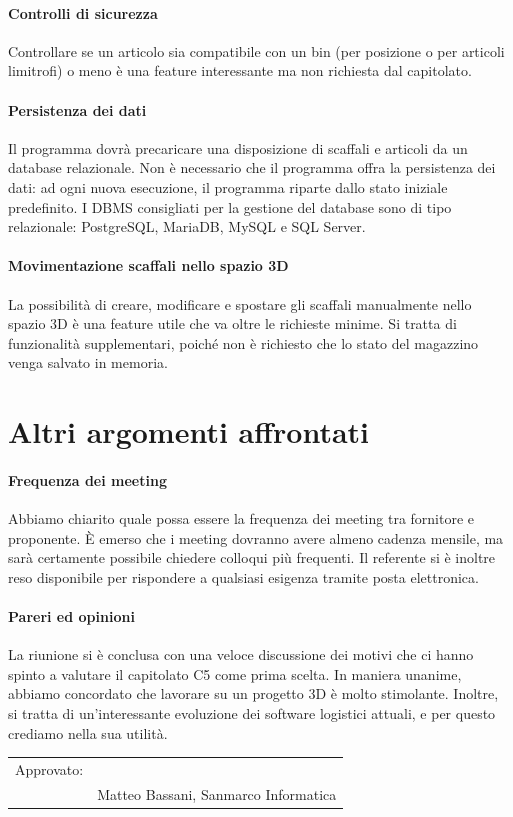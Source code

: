 \documentclass[12pt,a4paper]{article}
\begin{document}
\paragraph{Controlli di sicurezza}
Controllare se un articolo sia compatibile con un bin (per posizione o per articoli limitrofi) o meno è una feature interessante ma non richiesta dal capitolato.

\paragraph{Persistenza dei dati}
Il programma dovrà precaricare una disposizione di scaffali e articoli da un database relazionale. Non è necessario che il programma offra la persistenza dei dati: ad ogni nuova esecuzione, il programma riparte dallo stato iniziale predefinito. I DBMS consigliati per la gestione del database sono di tipo relazionale: PostgreSQL, MariaDB, MySQL e SQL Server.

\paragraph{Movimentazione scaffali nello spazio 3D} La possibilità di creare, modificare e spostare gli scaffali manualmente nello spazio 3D è una feature utile che va oltre le richieste minime. Si tratta di funzionalità supplementari, poiché non è richiesto che lo stato del magazzino venga salvato in memoria.

\section{Altri argomenti affrontati}

\paragraph{Frequenza dei meeting}
Abbiamo chiarito quale possa essere la frequenza dei meeting tra fornitore e proponente. È emerso che i meeting dovranno avere almeno cadenza mensile, ma sarà certamente possibile chiedere colloqui più frequenti. Il referente si è inoltre reso disponibile per rispondere a qualsiasi esigenza tramite posta elettronica.

\paragraph{Pareri ed opinioni}
La riunione si è conclusa con una veloce discussione dei motivi che ci hanno spinto a valutare il capitolato C5 come prima scelta. In maniera unanime, abbiamo concordato che lavorare su un progetto 3D è molto stimolante. Inoltre, si tratta di un'interessante evoluzione dei software logistici attuali, e per questo crediamo nella sua utilità.

\newpage

\begin{tabular}{@{}p{.5in}p{4in}@{}}
\small{Approvato:} & \hspace{0.3cm} \hrulefill \\
&  \hspace{0.3cm} \small{Matteo Bassani, Sanmarco Informatica}\\
\end{tabular}
\end{document}
